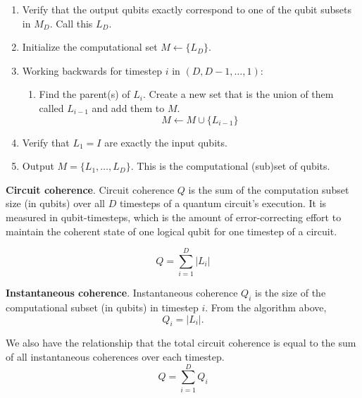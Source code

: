 \begin{enumerate}
\begin{enumerate}
\item
Verify that the output qubits exactly correspond to one of the qubit subsets
in $M_D$. Call this $L_D$.
\item
Initialize the computational set $M \leftarrow \{ L_D \}$.
\item
Working backwards for timestep $i$ in $(D, D-1, \ldots, 1)$:
\begin{enumerate}
\item
Find the parent(s) of $L_i$. Create a new set that is the union of them called $L_{i-1}$
and add them to $M$.
\begin{equation}
M \leftarrow M \cup \{L_{i-1}\}
\end{equation}
\end{enumerate}

\item Verify that $L_1 = I$ are exactly the input qubits.

\item Output $M = \{L_1, \ldots, L_D\}$. This is the computational (sub)set of qubits.

\end{enumerate}


\begin{definition}{\textbf{Circuit coherence}.}
Circuit coherence $Q$ is the sum of the computation subset size (in qubits)
over all $D$ timesteps of a quantum circuit's execution. It is measured
in qubit-timesteps, which is the amount of error-correcting effort to
maintain the coherent state of one logical qubit for one timestep of a circuit.

\begin{equation}
Q = \sum_{i=1}^D |L_i|
\end{equation}
\end{definition}


\begin{definition}{\textbf{Instantaneous coherence}.}
Instantaneous coherence $Q_i$ is the size of the computational subset
(in qubits) in timestep $i$. From the algorithm above,
\begin{equation}
Q_i = |L_i|\text{.}
\end{equation}

We also have the relationship that the total circuit coherence is equal
to the sum of all instantaneous coherences over each timestep.
\begin{equation}
Q = \sum_{i=1}^D Q_i
\end{equation}
\end{definition}


\end{enumerate}
